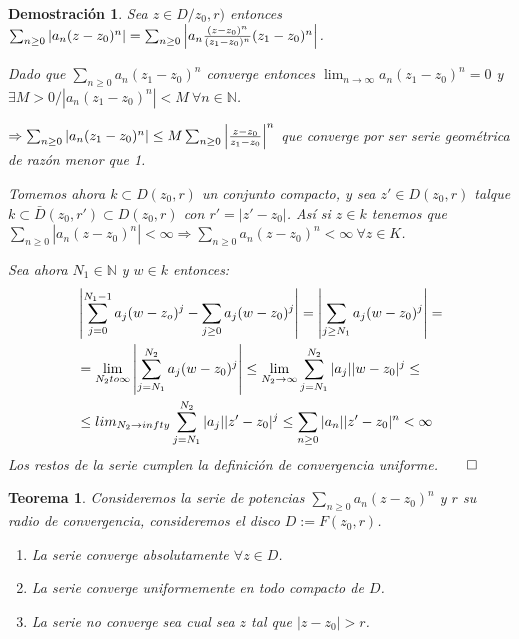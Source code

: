 \documentclass[10pt]{book}
\newtheorem{theorem}{Teorema}[chapter]
\newtheorem*{dem}{Demostración}
\newcommand{\N}{\mathbb{N}}
\begin{document}
\begin{dem}
Sea $z\in D/z_0,r)$ entonces  $\sum_{n\geq 0} \left| a_n(z-z_0)^n\right| = \sum_{n\geq 0}\left| a_n\frac{(z-z_0)^n}{(z_1-z_0)^n}(z_1-z_0)^n\right|$.

Dado que  $\sum_{n\geq 0} a_n(z_1-z_0)^n$ converge entonces $\lim_{n\to \infty} a_n(z_1-z_0)^n =0$ y $\exists M>0 / |a_n(z_1-z_0)^n|<M\ \forall n\in\N$.

$\Rightarrow \sum_{n\geq 0} \left| a_n(z_1-z_0)^n\right| \leq M\sum_{n\geq 0} \left| \frac{z-z_0}{z_1-z_0}\right|^n$ que converge por ser serie geométrica de razón menor que 1.

Tomemos ahora $k\subset D(z_0,r)$ un conjunto compacto, y sea $z' \in D(z_0,r)$ talque $k\subset \bar{D}(z_0,r')\subset D(z_0,r)$ con $r' = |z'-z_0|$.
Así si $z\in k$ tenemos que $\sum_{n\geq 0} |a_n(z-z_0)^n| <\infty \Rightarrow \sum_{n\geq 0} a_n(z-z_0)^n < \infty\ \forall z \in K$.

Sea ahora $N_1 \in \N$ y $w \in k$ entonces:
\begin{align*}
&\left|  \sum_{j=0}^{N_1-1} a_j(w-z_o)^j - \sum_{j\geq 0}a_j(w-z_0)^j \right| = \left|  \sum_{j\geq N_1}a_j(w-z_0)^j  \right| =\\
&=\lim_{N_2 to \infty} \left|  \sum_{j = N_1}^{N_2}a_j(w-z_0)^j  \right| \leq \lim_{N_2\to \infty} \sum_{j=N_1}^{N_2}|a_j||w-z_0|^j \leq\\
&\leq lim_{N_2 \to infty} \sum_{j=N_1}^{N_2}|a_j||z'-z_0|^j \leq \sum_{n\geq 0}|a_n||z'-z_0|^n < \infty
\end{align*}
Los restos de la serie cumplen la definición de convergencia uniforme.$\qed$
\end{dem}

\begin{theorem}
Consideremos la serie de potencias $\sum_{n\geq 0} a_n(z-z_0)^n$ y $r$ su radio de convergencia, consideremos el disco $D := F(z_0,r)$.
\begin{enumerate}
\item La serie converge absolutamente $\forall z \in D$.
\item La serie converge uniformemente en todo compacto de $D$.
\item La serie no converge sea cual sea $z$ tal que $|z-z_0|>r$.
\end{enumerate}
\end{theorem}
\end{document}

